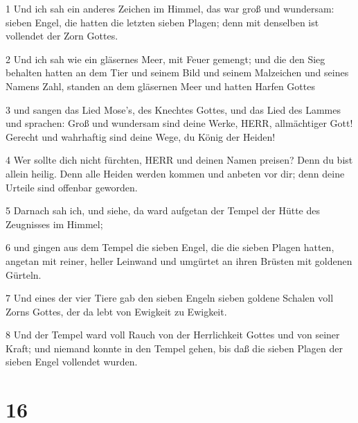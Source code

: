 \par 1 Und ich sah ein anderes Zeichen im Himmel, das war groß und wundersam: sieben Engel, die hatten die letzten sieben Plagen; denn mit denselben ist vollendet der Zorn Gottes.
\par 2 Und ich sah wie ein gläsernes Meer, mit Feuer gemengt; und die den Sieg behalten hatten an dem Tier und seinem Bild und seinem Malzeichen und seines Namens Zahl, standen an dem gläsernen Meer und hatten Harfen Gottes
\par 3 und sangen das Lied Mose's, des Knechtes Gottes, und das Lied des Lammes und sprachen: Groß und wundersam sind deine Werke, HERR, allmächtiger Gott! Gerecht und wahrhaftig sind deine Wege, du König der Heiden!
\par 4 Wer sollte dich nicht fürchten, HERR und deinen Namen preisen? Denn du bist allein heilig. Denn alle Heiden werden kommen und anbeten vor dir; denn deine Urteile sind offenbar geworden.
\par 5 Darnach sah ich, und siehe, da ward aufgetan der Tempel der Hütte des Zeugnisses im Himmel;
\par 6 und gingen aus dem Tempel die sieben Engel, die die sieben Plagen hatten, angetan mit reiner, heller Leinwand und umgürtet an ihren Brüsten mit goldenen Gürteln.
\par 7 Und eines der vier Tiere gab den sieben Engeln sieben goldene Schalen voll Zorns Gottes, der da lebt von Ewigkeit zu Ewigkeit.
\par 8 Und der Tempel ward voll Rauch von der Herrlichkeit Gottes und von seiner Kraft; und niemand konnte in den Tempel gehen, bis daß die sieben Plagen der sieben Engel vollendet wurden.

\chapter{16}

